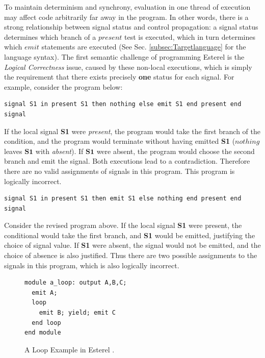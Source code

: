 \documentclass[acmsmall,review,anonymous]{acmart}\settopmatter{printfolios=true,printccs=false,printacmref=false}
\newcommand{\code}[1]{{\tt{\ensuremath{\m{#1}}}}}
\newcommand{\m}{\mathit}
\newcommand\secref[1]{Sec. \textcolor{black}{\ref{#1}}}
\begin{document}
To maintain determinism and synchrony, evaluation in one thread of execution may affect code arbitrarily far away in the program. In other words, there is a strong relationship between signal status and control propagation: a signal status determines which branch of a \code{present} test is executed, which in turn determines which \code{emit} statements are executed (See \secref{subsec:Targetlanguage} for the language syntax). 
The first semantic challenge of programming Esterel is the \emph{Logical Correctness} issue, caused by these non-local executions, which is simply the requirement that there exists precisely \textbf{one} status for each signal. For example, consider the program below:

\begin{lstlisting}
signal S1 in present S1 then nothing else emit S1 end present end signal
\end{lstlisting}  

If the local signal {\textbf{S1}} were \emph{present}, the program would take the first branch of the condition, and the program would terminate without having emitted {\textbf{S1}} (\code{nothing} leaves \code{\textbf{S1}} with   \emph{absent}). If \code{\textbf{S1}} were absent, the program would choose the second branch and emit the signal. Both executions lead to a contradiction. Therefore there are no valid assignments of signals in this program. This program is logically incorrect.


\begin{lstlisting}
signal S1 in present S1 then emit S1 else nothing end present end signal
\end{lstlisting}  

Consider the revised program above. If the local signal {\textbf{S1}} were present, the conditional would take the first branch, and  {\textbf{S1}} would be emitted, justifying
the choice of signal value. 
If {\textbf{S1}} were absent, the signal would not be emitted, and the choice of absence is also justified. Thus there are two possible assignments to the signals in this program, which is also logically incorrect.

\begin{figure}
    \vspace{-1mm}
\centering
\begin{lstlisting}
module a_loop: output A,B,C;
  emit A;
  loop 
  	emit B; yield; emit C
  end loop  
end module
\end{lstlisting}  
     \vspace{-1mm}
 \caption{A Loop Example in Esterel \cite{song2021synchronous}.} 
  \label{fig:loop1}
       \vspace{-1mm}
\end{figure}
\end{document}
